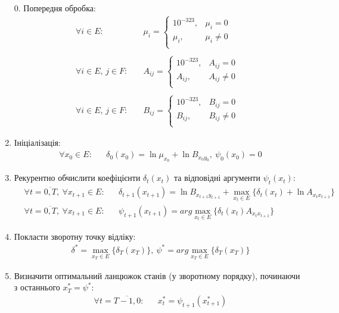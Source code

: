 \begin{enumerate}
    \item[0.] Попередня обробка:
    \begin{align*}
        \forall i\in E: \quad &\mu_i =
        \begin{cases}
            10^{-323}, & \mu_i = 0 \\
            \mu_i, & \mu_i \neq 0 \\
        \end{cases} \\ \\
        \forall i\in E,\, j\in F: \quad &A_{ij} =
        \begin{cases}
            10^{-323}, & A_{ij} = 0 \\
            A_{ij}, & A_{ij} \neq 0 \\
        \end{cases} \\ \\
        \forall i\in E,\, j\in F: \quad &B_{ij} =
        \begin{cases}
            10^{-323}, & B_{ij} = 0 \\
            B_{ij}, & B_{ij} \neq 0 \\
        \end{cases}
    \end{align*}
    \item Ініціалізація:
    \begin{align*}
        &\forall x_0\in E: && \delta_0(x_0)=\ln\mu_{x_0} + \ln B_{x_0y_0}, \ \psi_0(x_0)=0
    \end{align*}    
    \item Рекурентно обчислити коефіцієнти $\delta_t(x_t)$ та відповідні аргументи $\psi_t(x_t):$
    \begin{align*}
        &\forall t=\overline{0,T}, \ \forall x_{t+1} \in E: && \delta_{t+1}(x_{t+1})=\ln B_{x_{t+1}y_{t+1}}+ \max_{x_t\in E}\{\delta_t(x_t) + \ln A_{x_tx_{t+1}}\} \\
        &\forall t=\overline{0,T}, \ \forall x_{t+1} \in E: && \psi_{t+1}(x_{t+1})=arg\max_{x_t\in E}\{\delta_t(x_t)A_{x_tx_{t+1}}\}
    \end{align*}
    \item Покласти зворотну точку відліку:
    \begin{align*}
        &\delta^*=\max_{x_T\in E}\{\delta_T(x_T)\},\ \psi^*=arg\max_{x_T\in E}\{\delta_T(x_T)\}
    \end{align*}
    \item Визначити оптимальний ланцюжок станів (у зворотному порядку), починаючи з останнього $x_T^*=\psi^*:$
    \begin{align*}
        &\forall t=\overline{T-1,0}: && x_t^*=\psi_{t+1}(x_{t+1}^*)
    \end{align*}
\end{enumerate}

